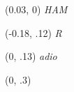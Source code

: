 \documentclass[12pt]{article}
\begin{document}
\textblockorigin{.2in}{.2in}

\begin{textblock}{0}(0.03, 0)
	\oefamily\itshape\scriptsize HAM
\end{textblock}

\begin{textblock}{0}(-0.18, .12)
	\oefamily\itshape\Huge R
\end{textblock}

\begin{textblock}{0}(0, .13)
	\oefamily\itshape\large adio
\end{textblock}

\begin{textblock}{0}(0, .3)
\end{textblock}

\end{document}
